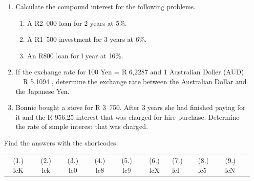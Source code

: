 \begin{enumerate}[noitemsep, label=\textbf{\arabic*}. ]
\label{m39335*uid89}\item Calculate the compound interest for the following problems.
\label{m39335*id75796}\begin{enumerate}[noitemsep, label=\textbf{\alph*}. ] 
            \label{m39335*uid90}\item A R2~000 loan for 2 years at 5\%.
\label{m39335*uid91}\item A R1~500 investment for 3 years at 6\%.
\label{m39335*uid92}\item An R800 loan for l year at 16\%.
\end{enumerate}
                
\label{m39335*uid93}\item If the exchange rate for 100 Yen = R 6,2287 and 1 Australian Doller (AUD) = R 5,1094 , determine the exchange rate between the Australian Dollar and the Japanese Yen.\newline
    
        
\label{m39335*uid94}\item Bonnie bought a stove for R 3~750. After 3 years she had finished paying for it and the R 956,25 interest that was charged for hire-purchase. Determine the rate of simple interest that was charged.\newline
    
        
\end{enumerate}
        
    
  \label{m39335**end}
          
       
    
  \label{5925cb6120ab0c0f7c78bd2516b027ff**end}
    
\par {} Find the answers with the shortcodes:
 \par \begin{tabular}[h]{cccccc}
 (1.) lcK  &  (2.) lck  &  (3.) lc0  &  (4.) lc8  &  (5.) lc9  &  (6.) lcX  &  (7.) lcI  &  (8.) lc5  &  (9.) lcN  & \end{tabular}



